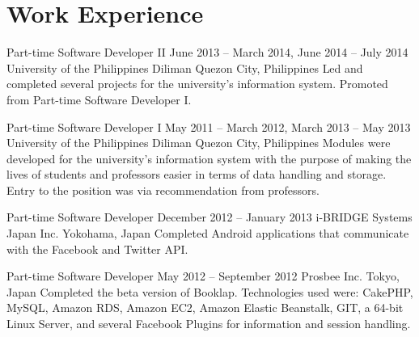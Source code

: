 \section*{Work Experience}

\employment
  {Part-time Software Developer II}
  {June 2013 -- March 2014, June 2014 -- July 2014}
  {University of the Philippines Diliman}
  {Quezon City, Philippines}
  {Led and completed several projects for the university's information system. Promoted from Part-time Software Developer I.}

\employment
  {Part-time Software Developer I}
  {May 2011 -- March 2012, March 2013 -- May 2013}
  {University of the Philippines Diliman}
  {Quezon City, Philippines}
  {Modules were developed for the university's information system with the purpose of making the lives of students and professors easier in terms of data handling and storage. Entry to the position was via recommendation from professors.}

\employment
  {Part-time Software Developer}
  {December 2012 -- January 2013}
  {i-BRIDGE Systems Japan Inc.}
  {Yokohama, Japan}
  {Completed Android applications that communicate with the Facebook and Twitter API.}

\employment
  {Part-time Software Developer}
  {May 2012 -- September 2012}
  {Prosbee Inc.}
  {Tokyo, Japan}
  {Completed the beta version of Booklap. Technologies used were: CakePHP, MySQL, Amazon RDS, Amazon EC2, Amazon Elastic Beanstalk, GIT, a 64-bit Linux Server, and several Facebook Plugins for information and session handling.}

